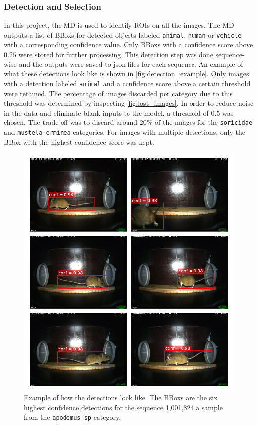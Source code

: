         \subsubsection{Detection and Selection}
        In this project, the \ac{MD} \autocite{morrisEfficientPipelineCamera2025} is used to identify \acsp{ROI} on all the images.
        The \ac{MD} outputs a list of \acp{BBox} for detected objects labeled \texttt{animal}, \texttt{human} or \texttt{vehicle} with a corresponding confidence value.
        Only \acp{BBox} with a confidence score above \(0.25\) were stored for further processing.
        This detection step was done sequence-wise and the outputs were saved to json files for each sequence.
        An example of what these detections look like is shown in \autoref{fig:detection_example}.
        Only images with a detection labeled \texttt{animal} and a confidence score above a certain threshold were retained.
        The percentage of images discarded per category due to this threshold was determined by inspecting \autoref{fig:lost_images}.
        In order to reduce noise in the data and eliminate blank inputs to the model, a threshold of \(0.5\) was chosen.
        The trade-off was to discard around \(20\%\) of the images for the \texttt{soricidae} and \texttt{mustela\_erminea} categories.
        For images with multiple detections, only the \ac{BBox} with the highest confidence score was kept.

        \begin{figure}[p]
        \centering
        \includegraphics{figures/detections_on_a_sequence.pdf}
        \caption{Example of how the detections look like. The \acsp{BBox} are the six highest confidence detections for the sequence 1,001,824 a sample from the \texttt{apodemus\_sp} category.}
        \label{fig:detection_example}
        \end{figure}

